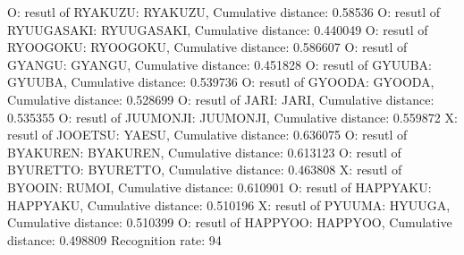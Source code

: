 O: resutl of RYAKUZU: RYAKUZU, Cumulative distance: 0.58536
O: resutl of RYUUGASAKI: RYUUGASAKI, Cumulative distance: 0.440049
O: resutl of RYOOGOKU: RYOOGOKU, Cumulative distance: 0.586607
O: resutl of GYANGU: GYANGU, Cumulative distance: 0.451828
O: resutl of GYUUBA: GYUUBA, Cumulative distance: 0.539736
O: resutl of GYOODA: GYOODA, Cumulative distance: 0.528699
O: resutl of JARI: JARI, Cumulative distance: 0.535355
O: resutl of JUUMONJI: JUUMONJI, Cumulative distance: 0.559872
X: resutl of JOOETSU: YAESU, Cumulative distance: 0.636075
O: resutl of BYAKUREN: BYAKUREN, Cumulative distance: 0.613123
O: resutl of BYURETTO: BYURETTO, Cumulative distance: 0.463808
X: resutl of BYOOIN: RUMOI, Cumulative distance: 0.610901
O: resutl of HAPPYAKU: HAPPYAKU, Cumulative distance: 0.510196
X: resutl of PYUUMA: HYUUGA, Cumulative distance: 0.510399
O: resutl of HAPPYOO: HAPPYOO, Cumulative distance: 0.498809
Recognition rate: 94%
